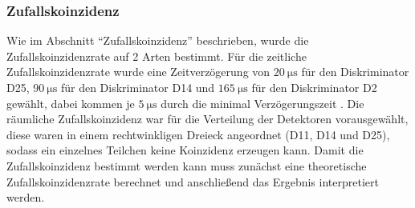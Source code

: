 \documentclass{article}
\begin{document}
\subsubsection*{Zufallskoinzidenz}
Wie im Abschnitt \enquote{Zufallskoinzidenz} beschrieben, wurde die Zufallskoinzidenzrate auf 2 Arten bestimmt.
Für die zeitliche Zufallskoinzidenzrate wurde eine Zeitverzögerung von $\SI{20}{\micro\second}$ für den Diskriminator D25, $\SI{90}{\micro\second}$ für den Diskriminator D14 und 
$\SI{165}{\micro\second}$ für den Diskriminator D2 gewählt, dabei kommen je $\SI{5}{\micro\second}$ durch die minimal Verzögerungszeit \cite{Anleitung}.
Die räumliche Zufallskoinzidenz war für die Verteilung der Detektoren vorausgewählt, diese waren in einem rechtwinkligen Dreieck angeordnet (D11, D14 und D25), sodass ein einzelnes Teilchen keine Koinzidenz erzeugen kann.
Damit die Zufallskoinzidenz bestimmt werden kann muss zunächst eine theoretische Zufallskoinzidenzrate berechnet und anschließend das Ergebnis interpretiert werden.
\end{document}
